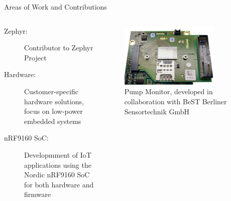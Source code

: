 \documentclass[10pt, aspectratio=169]{beamer}
\begin{document}
\begin{frame}[fragile]{Areas of Work and Contributions}
  \begin{columns}
    \begin{column}{0.5\textwidth}
      \begin{description}
        \item[Zephyr:] Contributor to Zephyr Project
        \item[Hardware:] Customer-specific hardware solutions, focus on low-power embedded systems
        \item[nRF9160 SoC:] Developmment of IoT applications using the Nordic nRF9160 SoC for both hardware and firmware
      \end{description}
    \end{column}
    \begin{column}{0.4\textwidth}
      \begin{figure}
        \includegraphics[width=0.8\textwidth]{images/jrov2201.jpg}
        \caption{Pump Monitor, developed in collaboration with BeST Berliner Sensortechnik GmbH}
      \end{figure}
    \end{column}
  \end{columns}
\end{frame}
\end{document}
